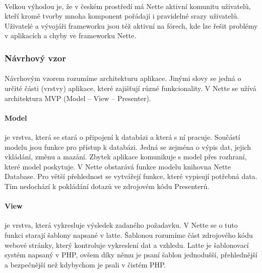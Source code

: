 \documentclass[11pt,a4paper,titlepage,oneside]{book}
\begin{document}
			\paragraph{} Velkou výhodou je, že v českém prostředí má Nette aktivní komunitu uživatelů, kteří kromě tvorby mnoha komponent pořádají i pravidelné srazy uživatelů.  Uživatelé a vývojáři frameworku jsou též aktivní na fórech, kde lze řešit problémy v aplikacích a chyby ve frameworku Nette.
			\subsubsection*{Návrhový vzor}
				\paragraph{} Návrhovým vzorem rozumíme architekturu aplikace. Jinými slovy se jedná o určité části (vrstvy) aplikace, které zajišťují různé funkcionality. V Nette se užívá architektura MVP (Model -- View -- Presenter).

				\paragraph{Model} je vrstva, která se stará o připojení k databázi a která s ní pracuje. Součástí modelu jsou funkce pro přístup k databázi. Jedná se zejména o výpis dat, jejich vkládání, změnu a mazání. Zbytek aplikace komunikuje s model přes rozhraní, které model poskytuje. V Nette obstarává funkce modelu knihovna Nette Database. Pro větší přehlednost se vytvářejí funkce, které vypisují potřebná data. Tím nedochází k pokládání dotazů ve zdrojovém kódu Presenterů.



				\paragraph{View} je vrstva, která vykresluje výsledek zadaného požadavku. V Nette se o tuto funkci starají šablony napsané v latte. Šablonou rozumíme část zdrojového kódu webové stránky, který kontroluje vykreslení dat a vzhledu. Latte je šablonovací systém napsaný v \ac{PHP}, ovšem díky němu je psaní šablon jednodušší, přehlednější a bezpečnější než kdybychom je psali v čistém PHP.
\end{document}
